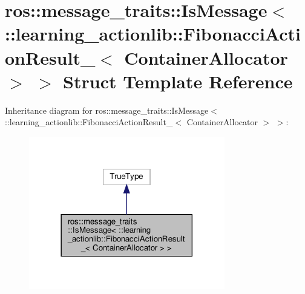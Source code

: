 \hypertarget{structros_1_1message__traits_1_1IsMessage_3_01_1_1learning__actionlib_1_1FibonacciActionResult__b6f812ccb39c7e5d95522e148b00e1c1}{}\section{ros\+:\+:message\+\_\+traits\+:\+:Is\+Message$<$ \+:\+:learning\+\_\+actionlib\+:\+:Fibonacci\+Action\+Result\+\_\+$<$ Container\+Allocator $>$ $>$ Struct Template Reference}
\label{structros_1_1message__traits_1_1IsMessage_3_01_1_1learning__actionlib_1_1FibonacciActionResult__b6f812ccb39c7e5d95522e148b00e1c1}


Inheritance diagram for ros\+:\+:message\+\_\+traits\+:\+:Is\+Message$<$ \+:\+:learning\+\_\+actionlib\+:\+:Fibonacci\+Action\+Result\+\_\+$<$ Container\+Allocator $>$ $>$\+:
\nopagebreak
\begin{figure}[H]
\begin{center}
\leavevmode
\includegraphics[width=242pt]{structros_1_1message__traits_1_1IsMessage_3_01_1_1learning__actionlib_1_1FibonacciActionResult__60cb88408f87bc5901489159d74ed8de}
\end{center}
\end{figure}


